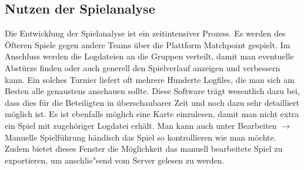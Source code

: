 \subsection{Nutzen der Spielanalyse}\label{subsec:nutzen-der-spielanalyse}
Die Entwicklung der Spielanalyse ist ein zeitintensiver Prozess.
Es werden des \"Ofteren Spiele gegen andere Teams \"uber die Plattform Matchpoint gespielt.
Im Anschluss werden die Logdateien an die Gruppen verteilt, damit man eventuelle Abst\"urze finden oder auch generell den Spielverlauf anzeigen und verbessern kann.
Ein solches Turnier liefert oft mehrere Hunderte Logfiles, die man sich am Besten alle genaustens anschauen sollte.
Diese Software tr\"agt wesentlich dazu bei, dass dies f\"ur die Beteiligten in \"uberschaubarer Zeit und noch dazu sehr detailliert m\"oglich ist.
Es ist ebenfalls m\"oglich eine Karte einzulesen, damit man nicht extra ein Spiel mit zugeh\"origer Logdatei erh\"alt.
Man kann auch unter Bearbeiten $\rightarrow$ Manuelle Spielf\"uhrung h\"andisch das Spiel so kontrollieren wie man m\"ochte.
Zudem bietet dieses Fenster die M\"oglichkeit das manuell bearbeitete Spiel zu exportieren, um anschlie"send vom Server gelesen zu werden.


\bigskip
\newpage